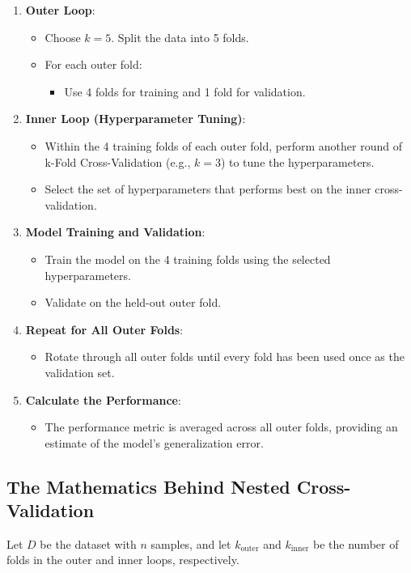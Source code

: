 \documentclass[10pt]{article}
\begin{document}
\begin{enumerate}
    \item \textbf{Outer Loop}:
    \begin{itemize}
        \item Choose \(k=5\). Split the data into 5 folds.
        \item For each outer fold:
        \begin{itemize}
            \item Use 4 folds for training and 1 fold for validation.
        \end{itemize}
    \end{itemize}
    \item \textbf{Inner Loop (Hyperparameter Tuning)}:
    \begin{itemize}
        \item Within the 4 training folds of each outer fold, perform another round of k-Fold Cross-Validation (e.g., \(k=3\)) to tune the hyperparameters.
        \item Select the set of hyperparameters that performs best on the inner cross-validation.
    \end{itemize}
    \item \textbf{Model Training and Validation}:
    \begin{itemize}
        \item Train the model on the 4 training folds using the selected hyperparameters.
        \item Validate on the held-out outer fold.
    \end{itemize}
    \item \textbf{Repeat for All Outer Folds}:
    \begin{itemize}
        \item Rotate through all outer folds until every fold has been used once as the validation set.
    \end{itemize}
    \item \textbf{Calculate the Performance}:
    \begin{itemize}
        \item The performance metric is averaged across all outer folds, providing an estimate of the model’s generalization error.
    \end{itemize}
\end{enumerate}

\subsection{The Mathematics Behind Nested Cross-Validation}
Let \(D\) be the dataset with \(n\) samples, and let \(k_{\text{outer}}\) and \(k_{\text{inner}}\) be the number of folds in the outer and inner loops, respectively.
\end{document}
